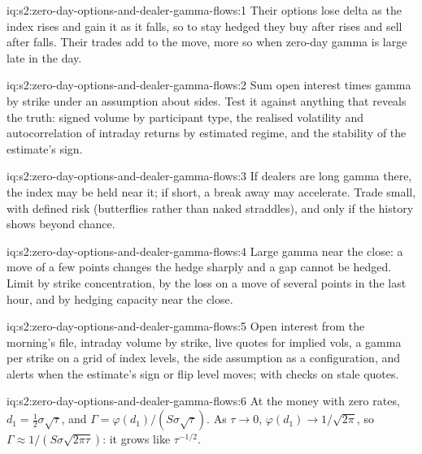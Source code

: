 \begin{solution}{iq:s2:zero-day-options-and-dealer-gamma-flows:1}
Their options lose delta as the index rises and gain it as it falls, so to stay hedged they buy after rises and sell after falls. Their trades add to
the move, more so when zero-day gamma is large late in the day.
\end{solution}

\begin{solution}{iq:s2:zero-day-options-and-dealer-gamma-flows:2}
Sum open interest times gamma by strike under an assumption about sides. Test it against anything that reveals the truth: signed volume by
participant type, the realised volatility and autocorrelation of intraday returns by estimated regime, and the stability of the estimate's sign.
\end{solution}

\begin{solution}{iq:s2:zero-day-options-and-dealer-gamma-flows:3}
If dealers are long gamma there, the index may be held near it; if short, a break away may accelerate. Trade small, with defined risk (butterflies
rather than naked straddles), and only if the history shows  beyond chance.
\end{solution}

\begin{solution}{iq:s2:zero-day-options-and-dealer-gamma-flows:4}
Large gamma near the close: a move of a few points changes the hedge sharply and a gap cannot be hedged. Limit by strike concentration, by the loss
on a move of several points in the last hour, and by hedging capacity near the close.
\end{solution}

\begin{solution}{iq:s2:zero-day-options-and-dealer-gamma-flows:5}
Open interest from the morning's file, intraday volume by strike, live quotes for implied vols, a gamma per strike on a grid of index levels, the side
assumption as a configuration, and alerts when the estimate's sign or flip level moves; with checks on stale quotes.
\end{solution}

\begin{solution}{iq:s2:zero-day-options-and-dealer-gamma-flows:6}
At the money with zero rates, $d_1 = \tfrac12\sigma\sqrt\tau$, and $\Gamma = \varphi(d_1)/(S\sigma\sqrt\tau)$. As $\tau \to 0$, $\varphi(d_1) \to
1/\sqrt{2\pi}$, so $\Gamma \approx 1/(S\sigma\sqrt{2\pi\tau})$: it grows like $\tau^{-1/2}$.
\end{solution}
